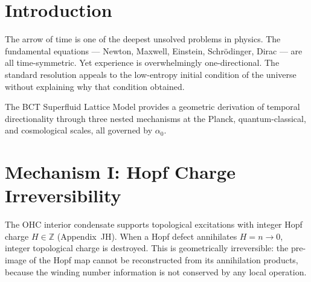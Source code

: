 \documentclass[aps,prl,twocolumn,showpacs,superscriptaddress]{revtex4-2}
\begin{document}
\begin{abstract}
We derive the arrow of time from BCT vacuum geometry through three nested 
mechanisms, all governed by the single constant $\alpha_0 = r_{\rm oct} \times 
r_{\rm tet}/\pi = 0.0074081$. At the Planck scale, Hopf charge quantisation 
$H \in \mathbb{Z}$ makes annihilation $H\to 0$ geometrically irreversible --- 
time is the count of irreversible OHC topological transitions. At the 
quantum-classical boundary, the measurement threshold $N_c = 1/\alpha_0 \approx 135$ 
(Letter~72) marks where geometric irreversibility becomes thermodynamic entropy 
increase. At the cosmological scale, the Josephson equation of state 
$w = -(1-2\alpha_0) \neq -1$ (Letter~76) breaks time-reversal symmetry: 
the expanding and contracting phases of the cosmic oscillation are not mirror 
images. The same $\alpha_0$ governing CP violation in baryogenesis (Letter~71) 
also governs T-violation in the cosmic equation of state. The arrow of time 
is a geometric theorem. The universe cannot run backwards because its equation 
of state does not permit it.
\end{abstract}

\maketitle

\section{Introduction}

The arrow of time is one of the deepest unsolved problems in physics. The 
fundamental equations --- Newton, Maxwell, Einstein, Schr\"{o}dinger, Dirac 
--- are all time-symmetric. Yet experience is overwhelmingly one-directional. 
The standard resolution appeals to the low-entropy initial condition of the 
universe without explaining why that condition obtained.

The BCT Superfluid Lattice Model provides a geometric derivation of temporal 
directionality through three nested mechanisms at the Planck, 
quantum-classical, and cosmological scales, all governed by $\alpha_0$.

\section{Mechanism I: Hopf Charge Irreversibility}

The OHC interior condensate supports topological excitations with integer 
Hopf charge $H \in \mathbb{Z}$ (Appendix~JH). When a Hopf defect annihilates 
$H = n \to 0$, integer topological charge is destroyed. This is geometrically 
irreversible: the pre-image of the Hopf map cannot be reconstructed from its 
annihilation products, because the winding number information is not conserved 
by any local operation.
\end{document}

